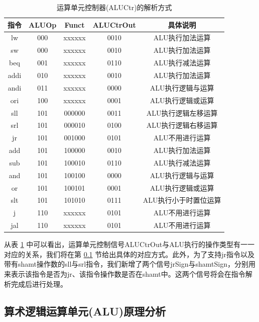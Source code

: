 \documentclass{cumcm}
\numberwithin{equation}{section}
\numberwithin{equation}{subsection}
\begin{document}
\begin{table}[htbp]
    \centering
    \begin{tabular}{|c|c|c|c|c|}
        \hline
        指令 & ALUOp & Funct & ALUCtrOut & 具体说明\\ \hline
        lw & 000 & xxxxxx & 0010 & ALU执行加法运算 \\
        sw & 000 & xxxxxx & 0010 & ALU执行加法运算 \\
        beq & 001 & xxxxxx & 0110 & ALU执行减法运算 \\
        addi & 010 & xxxxxx & 0010 & ALU执行加法运算 \\
        andi & 011 & xxxxxx & 0000 & ALU执行逻辑与运算 \\
        ori & 100 & xxxxxx & 0001 & ALU执行逻辑或运算 \\
        sll & 101 & 000000 & 0011 & ALU执行逻辑左移运算 \\
        srl & 101 & 000010 & 0100 & ALU执行逻辑右移运算 \\
        jr & 101 & 001000 & 0101 & ALU不用进行运算 \\
        add & 101 & 100000 & 0010 & ALU执行加法运算 \\
        sub & 101 & 100010 & 0110 & ALU执行减法运算 \\
        and & 101 & 100100 & 0000 & ALU执行逻辑与运算 \\
        or & 101 & 100101 & 0001 & ALU执行逻辑或运算 \\
        slt & 101 & 101010 & 0111 & ALU执行小于时置位运算 \\
        j & 110 & xxxxxx & 0101 & ALU不用进行运算 \\
        jal & 110 & xxxxxx & 0101 & ALU不用进行运算 \\
        \hline
    \end{tabular}
    \caption{运算单元控制器(ALUCtr)的解析方式}
    \label{tab3}
\end{table}

从表 \ref{tab3} 中可以看出，运算单元控制信号ALUCtrOut与ALU执行的操作类型有一一对应的关系，我们将在第 \ref{section2.3} 节给出具体的对应方式。此外，为了支持jr指令以及带有shamt操作数的sll与srl指令，我们新增了两个信号jrSign与shamtSign，分别用来表示该指令是否为jr、该指令操作数是否在shamt中。这两个信号将会在指令解析完成后进行处理。

\subsection{算术逻辑运算单元(ALU)原理分析}\label{section2.3}
\end{document}
